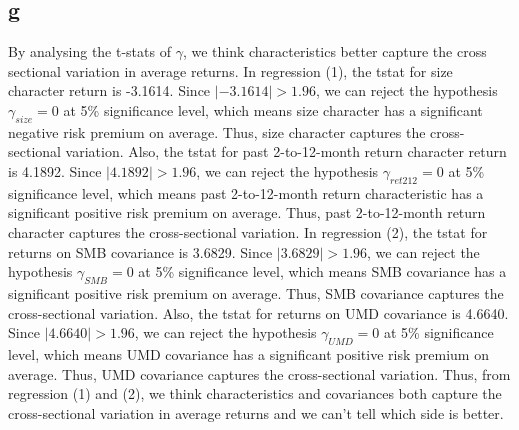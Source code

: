 \documentclass{report}
\begin{document}
\subsection{g}
By analysing the t-stats of $\gamma$, we think characteristics better capture the cross sectional variation in average returns. In regression (1), the tstat for size character return is -3.1614. Since $|-3.1614|>1.96$, we can reject the hypothesis $\gamma_{size} = 0$ at 5\% significance level, which means size character has a significant negative risk premium on average. Thus, size character captures the cross-sectional variation. Also, the tstat for past 2-to-12-month return  character return is 4.1892. Since $|4.1892|>1.96$, we can reject the hypothesis $\gamma_{ret212} = 0$ at 5\% significance level, which means past 2-to-12-month return characteristic has a significant positive risk premium on average. Thus, past 2-to-12-month return character captures the cross-sectional variation. In regression (2), the tstat for returns on SMB covariance is 3.6829. Since $|3.6829|>1.96$, we can reject the hypothesis $\gamma_{SMB} = 0$ at 5\% significance level, which means SMB covariance has a significant positive risk premium on average. Thus, SMB covariance captures the cross-sectional variation. Also, the tstat for returns on UMD covariance is 4.6640. Since $|4.6640|>1.96$, we can reject the hypothesis $\gamma_{UMD} = 0$ at 5\% significance level, which means UMD covariance has a significant positive risk premium on average. Thus, UMD covariance captures the cross-sectional variation. Thus, from regression (1) and (2), we think characteristics and covariances both capture the cross-sectional variation in average returns and we can't tell which side is better. 
\end{document}
